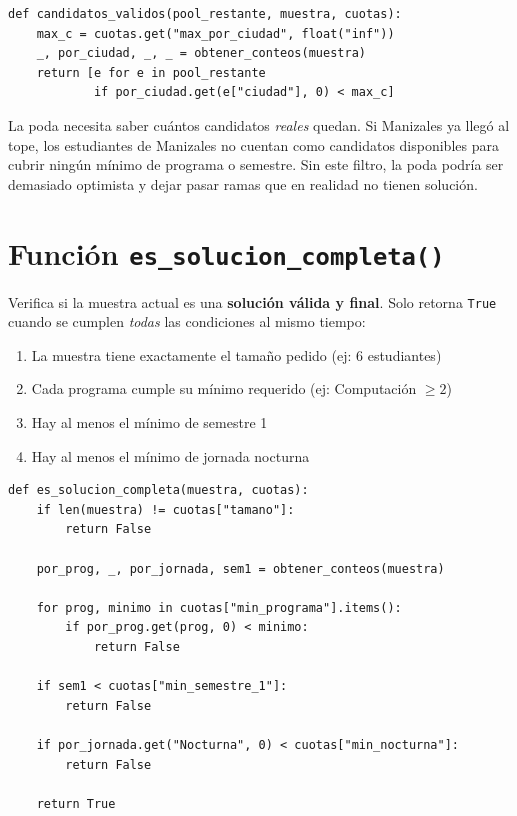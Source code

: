 \documentclass[11pt, a4paper]{article}
\begin{document}
\begin{lstlisting}[style=python]
def candidatos_validos(pool_restante, muestra, cuotas):
    max_c = cuotas.get("max_por_ciudad", float("inf"))
    _, por_ciudad, _, _ = obtener_conteos(muestra)
    return [e for e in pool_restante
            if por_ciudad.get(e["ciudad"], 0) < max_c]
\end{lstlisting}

\begin{porqueimporta}
La poda necesita saber cuántos candidatos \emph{reales} quedan. Si Manizales ya llegó al tope, los estudiantes de Manizales no cuentan como candidatos disponibles para cubrir ningún mínimo de programa o semestre. Sin este filtro, la poda podría ser demasiado optimista y dejar pasar ramas que en realidad no tienen solución.
\end{porqueimporta}

\section{Función \texttt{es\_solucion\_completa()}}

\begin{quehaec}
Verifica si la muestra actual es una \textbf{solución válida y final}. Solo retorna \texttt{True} cuando se cumplen \emph{todas} las condiciones al mismo tiempo:
\begin{enumerate}[noitemsep]
  \item La muestra tiene exactamente el tamaño pedido (ej: 6 estudiantes)
  \item Cada programa cumple su mínimo requerido (ej: Computación $\geq 2$)
  \item Hay al menos el mínimo de semestre 1
  \item Hay al menos el mínimo de jornada nocturna
\end{enumerate}
\end{quehaec}

\begin{lstlisting}[style=python]
def es_solucion_completa(muestra, cuotas):
    if len(muestra) != cuotas["tamano"]:
        return False

    por_prog, _, por_jornada, sem1 = obtener_conteos(muestra)

    for prog, minimo in cuotas["min_programa"].items():
        if por_prog.get(prog, 0) < minimo:
            return False

    if sem1 < cuotas["min_semestre_1"]:
        return False

    if por_jornada.get("Nocturna", 0) < cuotas["min_nocturna"]:
        return False

    return True
\end{lstlisting}
\end{document}

